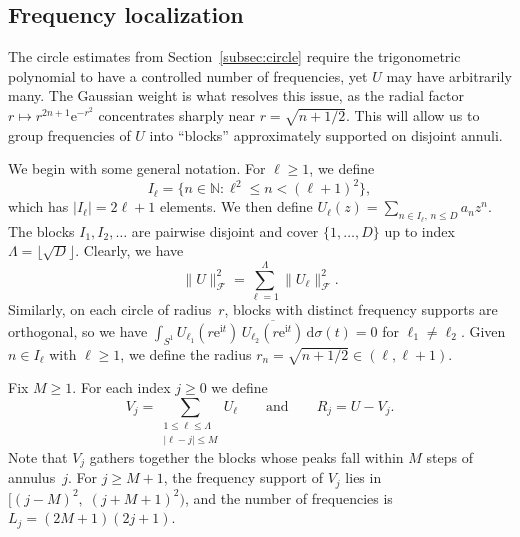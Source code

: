 \documentclass[11pt]{amsart}
\theoremstyle{remark}
\begin{document}
\subsection{Frequency localization}\label{subsec:blocks}
The circle estimates from Section~\ref{subsec:circle} require the trigonometric
polynomial to have a controlled number of frequencies, yet $U$ may have
arbitrarily many.  The Gaussian weight is what resolves this issue, as the radial factor
$r \mapsto r^{2n+1}\mathrm{e}^{-r^2}$ concentrates sharply near $r = \sqrt{n + 1/2}$. This will allow us to group frequencies of $U$ into ``blocks''
approximately supported on disjoint annuli.
 \vspace{0.5em}

We begin with some general notation. For $\ell \ge 1$, we define 
\[
I_\ell = \bigl\{n \in \mathbb{N} : \ell^2 \le n < (\ell+1)^2\bigr\},
\]
which has $\lvert I_\ell \rvert = 2\ell+1$ elements. We then define 
$U_\ell(z) = \sum_{n \in I_\ell,\, n \le D} a_n z^n$. The blocks $I_1, I_2, \dots$ are pairwise disjoint and cover
$\{1, \dots, D\}$ up to index $\Lambda = \lfloor\sqrt{D}\rfloor$.  Clearly, we have
\begin{equation}\label{eq:fock-decomp}
\lVert U \rVert_{\mathcal{F}}^2 = \sum_{\ell=1}^{\Lambda} \lVert U_\ell \rVert_{\mathcal{F}}^2.
\end{equation}
Similarly, on each circle of radius~$r$, blocks with distinct frequency
supports are orthogonal, so we have
$\int_{S^1} U_{\ell_1}(r\mathrm{e}^{\mathrm{i} t})\,
\overline{U_{\ell_2}(r\mathrm{e}^{\mathrm{i} t})}\,\mathrm{d}\sigma(t) = 0$
for $\ell_1 \ne \ell_2$. Given $n\in I_\ell$ with $\ell \geq 1$, we define the radius $r_n = \sqrt{n+1/2}\in (\ell, \ell+1)$.  \vspace{0.5em}

Fix  $M \ge 1$.  For each index $j \ge 0$ we define 
\[
V_j = \sum_{\substack{1 \le \ell \le \Lambda \\ \lvert \ell - j \rvert \le M}} U_\ell
\qquad\text{and} \qquad
R_j = U - V_j.
\]
Note that $V_j$ gathers together the blocks whose peaks fall within $M$ steps of
annulus~$j$. For $j \ge M + 1$, the frequency support of $V_j$ lies in
$[(j{-}M)^2,\; (j{+}M{+}1)^2)$, and the number of frequencies is
$L_j = (2M{+}1)(2j{+}1)$.
 \vspace{0.5em}
\end{document}
